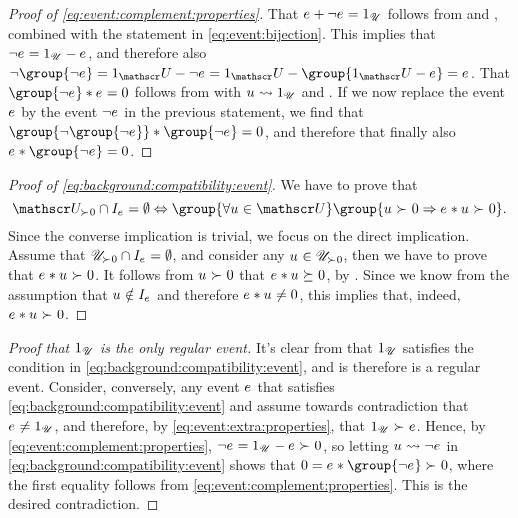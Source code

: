 \documentclass[preprint]{isipta2025}
\begin{document}
\begin{proof}[Proof of \cref{eq:event:complement:properties}]
That \(e_{}+\neg e_{}=1_{\mathscr{U}}\) follows from  and , combined with the statement in \cref{eq:event:bijection}.
This implies that \(\neg e_{}=1_{\mathscr{U}}-e_{}\), and therefore also \(\neg\group{\neg\eventopt}=\uniteventopt-\neg\eventopt=\uniteventopt-\group{\uniteventopt-\eventopt}=\eventopt\).
That \(\group{\neg\eventopt}\ast\eventopt=0\) follows from  with \(u_{}\rightsquigarrow1_{\mathscr{U}}\) and .
If we now replace the event \(e_{}\) by the event \(\neg e_{}\) in the previous statement, we find that \(\group{\neg\group{\neg\eventopt}}\ast\group{\neg\eventopt}=0\), and therefore that finally also \(\eventopt\ast\group{\neg\eventopt}=0\).
\end{proof}

\begin{proof}[Proof of \cref{eq:background:compatibility:event}]
We have to prove that
\begin{equation*}
\posopts\cap\eventindifset=\emptyset
\ifandonlyif
\group{\forall\opt\in\opts}\group{\opt\optgt0\then\calledoff{\opt}\optgt0}.
\end{equation*}
Since the converse implication is trivial, we focus on the direct implication.
Assume that \(\mathscr{U}_{\mathrel{\succ_{}}0}\cap I_{{e_{}}}=\emptyset\), and consider any \(u_{}\in\mathscr{U}_{\mathrel{\succ_{}}0}\), then we have to prove that \(e_{}\ast u_{}\mathrel{\succ_{}}0\).
It follows from \(u_{}\mathrel{\succ_{}}0\) that \(e_{}\ast u_{}\mathrel{\succeq_{}}0\), by .
Since we know from the assumption that \(u_{}\notin I_{{e_{}}}\) and therefore \(e_{}\ast u_{}\neq0\), this implies that, indeed, \(e_{}\ast u_{}\mathrel{\succ_{}}0\).
\end{proof}

\begin{proof}[Proof that \(1_{\mathscr{U}}\) is the only regular event]
It's clear from  that \(1_{\mathscr{U}}\) satisfies the condition in \cref{eq:background:compatibility:event}, and is therefore is a regular event.
Consider, conversely, any event \(e_{}\) that satisfies \cref{eq:background:compatibility:event} and assume towards contradiction that \(e_{}\neq1_{\mathscr{U}}\), and therefore, by \cref{eq:event:extra:properties}, that \(1_{\mathscr{U}}\mathrel{\succ_{}}e_{}\).
Hence, by \cref{eq:event:complement:properties}, \(\neg e_{}=1_{\mathscr{U}}-e_{}\mathrel{\succ_{}}0\), so letting \(u_{}\rightsquigarrow\neg e_{}\) in \cref{eq:background:compatibility:event} shows that \(0=\eventopt\ast\group{\neg\eventopt}\optgt0\), where the first equality follows from \cref{eq:event:complement:properties}.
This is the desired contradiction.
\end{proof}
\end{document}
